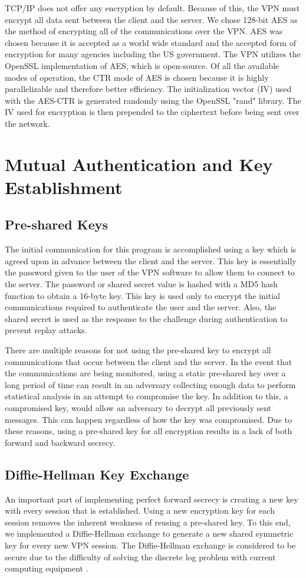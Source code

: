 \documentclass[journal]{IEEEtran}
\begin{document}
TCP/IP does not offer any encryption by default. Because of this, the VPN must encrypt all data sent between the client and the server. We chose 128-bit AES as the method of encrypting all of the communications over the VPN. AES was chosen because it is accepted as a world wide standard and the accepted form of encryption for many agencies including the US government. The VPN utilizes the OpenSSL implementation of AES, which is open-source. Of all the available modes of operation, the CTR mode of AES is chosen because it is highly parallelizable and therefore better efficiency. The initialization vector (IV) used with the AES-CTR is generated randomly using the OpenSSL "rand" library. The IV used for encryption is then prepended to the ciphertext before being sent over the network.

\section{Mutual Authentication and Key Establishment}
\subsection*{Pre-shared Keys}
The initial communication for this program is accomplished using a key which is agreed upon in advance between the client and the server. This key is essentially the password given to the user of the VPN software to allow them to connect to the server. The password or shared secret value is hashed with a MD5 hash function to obtain a 16-byte key. This key is used only to encrypt the initial communications required to authenticate the user and the server. Also, the shared secret is used as the response to the challenge during authentication to prevent replay attacks.

There are multiple reasons for not using the pre-shared key to encrypt all communications that occur between the client and the server. In the event that the communications are being monitored, using a static pre-shared key over a long period of time can result in an adversary collecting enough data to perform statistical analysis in an attempt to compromise the key. In addition to this, a compromised key, would allow an adversary to decrypt all previously sent messages. This can happen regardless of how the key was compromised. Due to these reasons, using a pre-shared key for all encryption results in a lack of both forward and backward secrecy.

\subsection*{Diffie-Hellman Key Exchange}
An important part of implementing perfect forward secrecy is creating a new key with every session that is established. Using a new encryption key for each session removes the inherent weakness of reusing a pre-shared key. To this end, we implemented a Diffie-Hellman exchange to generate a new shared symmetric key for every new VPN session. The Diffie-Hellman exchange is considered to be secure due to the difficulty of solving the discrete log problem with current computing equipment \cite{dh hardness}.
\end{document}
